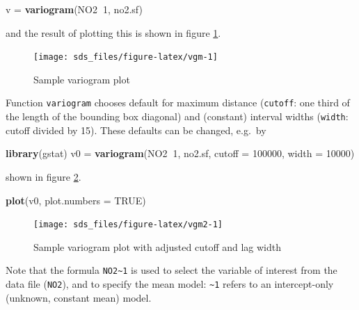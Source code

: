 \documentclass[]{book}
\newenvironment{Shaded}{\begin{snugshade}}{\end{snugshade}}
\newcommand{\DataTypeTok}[1]{\textcolor[rgb]{0.13,0.29,0.53}{#1}}
\newcommand{\DecValTok}[1]{\textcolor[rgb]{0.00,0.00,0.81}{#1}}
\newcommand{\KeywordTok}[1]{\textcolor[rgb]{0.13,0.29,0.53}{\textbf{#1}}}
\newcommand{\NormalTok}[1]{#1}
\newcommand{\OperatorTok}[1]{\textcolor[rgb]{0.81,0.36,0.00}{\textbf{#1}}}
\newcommand{\OtherTok}[1]{\textcolor[rgb]{0.56,0.35,0.01}{#1}}
\newcommand{\StringTok}[1]{\textcolor[rgb]{0.31,0.60,0.02}{#1}}
\begin{document}
\begin{Shaded}
\begin{Highlighting}[]
\NormalTok{v =}\StringTok{ }\KeywordTok{variogram}\NormalTok{(NO2}\OperatorTok{~}\DecValTok{1}\NormalTok{, no2.sf)}
\end{Highlighting}
\end{Shaded}

and the result of plotting this is shown in figure \ref{fig:vgm}.

\begin{figure}

{\centering \texttt{[image: sds\_files/figure-latex/vgm-1]} 

}

\caption{Sample variogram plot}\label{fig:vgm}
\end{figure}

Function \texttt{variogram} chooses default for maximum distance (\texttt{cutoff}: one third of the length of the bounding box diagonal) and (constant) interval widths (\texttt{width}: cutoff divided by 15). These defaults can be changed, e.g.~by

\begin{Shaded}
\begin{Highlighting}[]
\KeywordTok{library}\NormalTok{(gstat)}
\NormalTok{v0 =}\StringTok{ }\KeywordTok{variogram}\NormalTok{(NO2}\OperatorTok{~}\DecValTok{1}\NormalTok{, no2.sf, }\DataTypeTok{cutoff =} \DecValTok{100000}\NormalTok{, }\DataTypeTok{width =} \DecValTok{10000}\NormalTok{)}
\end{Highlighting}
\end{Shaded}

shown in figure \ref{fig:vgm2}.

\begin{Shaded}
\begin{Highlighting}[]
\KeywordTok{plot}\NormalTok{(v0, }\DataTypeTok{plot.numbers =} \OtherTok{TRUE}\NormalTok{)}
\end{Highlighting}
\end{Shaded}

\begin{figure}

{\centering \texttt{[image: sds\_files/figure-latex/vgm2-1]} 

}

\caption{Sample variogram plot with adjusted cutoff and lag width}\label{fig:vgm2}
\end{figure}

Note that the formula \texttt{NO2\textasciitilde{}1} is used to select the variable of interest from the data file (\texttt{NO2}), and to specify the mean model: \texttt{\textasciitilde{}1} refers to an intercept-only (unknown, constant mean) model.
\end{document}
